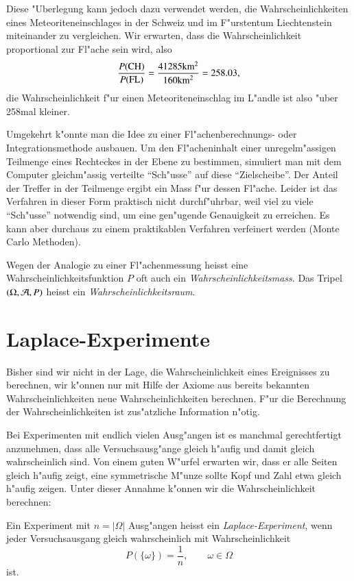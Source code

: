 Diese
"Uberlegung kann jedoch dazu verwendet werden, die Wahrscheinlichkeiten
eines Meteoriteneinschlages in der Schweiz und im F"urstentum Liechtenstein
miteinander zu vergleichen.
Wir erwarten, dass die Wahrscheinlichkeit
proportional zur Fl"ache sein wird, also
\[
\frac{P(\text{CH})}{P(\text{FL})}=
\frac{41285\text{km$\mathstrut^2$}}{160\text{km$\mathstrut^2$}}
=258.03,
\]
die Wahrscheinlichkeit f"ur einen Meteoriteneinschlag im L"andle ist also
"uber 258mal kleiner.

Umgekehrt k"onnte man die Idee zu einer Fl"achenberechnungs- oder
Integra\-tions\-methode ausbauen.
Um den Fl"acheninhalt einer unregelm"assigen
Teilmenge
eines Rechteckes in der Ebene zu bestimmen, simuliert man mit dem
Computer gleichm"assig verteilte ``Sch"usse'' auf diese ``Zielscheibe''.
Der Anteil der Treffer in der Teilmenge ergibt ein Mass f"ur dessen
Fl"ache.
Leider ist das Verfahren in dieser Form praktisch nicht
durchf"uhrbar, weil viel zu viele ``Sch"usse'' notwendig sind, um
eine gen"ugende Genauigkeit zu erreichen.
Es kann aber durchaus
zu einem praktikablen Verfahren verfeinert werden (Monte Carlo Methoden).

Wegen
der Analogie zu einer Fl"achenmessung heisst eine
Wahrscheinlichkeitsfunktion $P$ oft auch ein {\em Wahrscheinlichkeitsmass}.
Das Tripel $(\Omega,{\cal A}, P)$ heisst ein {\em Wahrscheinlichkeitsraum}.

\section{Laplace-Experimente} \label{section-laplace-ereignisse}
Bisher sind wir nicht in der Lage, die Wahrscheinlichkeit eines Ereignisses
zu berechnen, wir k"onnen nur mit Hilfe der Axiome aus bereits bekannten
Wahrscheinlichkeiten neue Wahrscheinlichkeiten berechnen.
F"ur die Berechnung der Wahrscheinlichkeiten ist zus"atzliche
Information n"otig.

Bei Experimenten mit endlich vielen Ausg"angen ist es manchmal gerechtfertigt
anzunehmen, dass alle Versuchsausg"ange gleich h"aufig und damit gleich
wahrscheinlich sind.
Von einem guten W"urfel erwarten wir, dass er alle Seiten gleich h"aufig
zeigt, eine symmetrische M"unze sollte Kopf und Zahl etwa gleich h"aufig
zeigen.
Unter dieser Annahme k"onnen wir die Wahrscheinlichkeit berechnen:

\begin{definition}
Ein Experiment mit $n=|\Omega|$ Ausg"angen heisst ein {\em Laplace-Experiment},
wenn jeder Versuchsausgang gleich wahrscheinlich mit Wahrscheinlichkeit
\[
P(\{\omega\})=\frac1n,\qquad\omega\in\Omega
\]
ist.
\end{definition}


